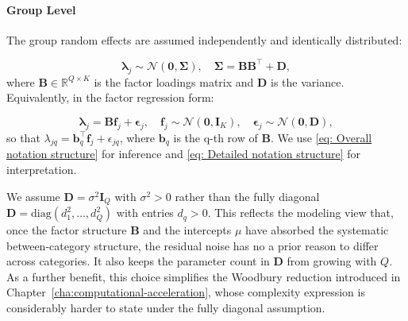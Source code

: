 \paragraph*{Group Level}

The group random effects are assumed independently and identically distributed:

\begin{equation}
    \bm{\lambda}_{j}\sim \mathcal{N}(\bm{0},\bm{\Sigma}), \quad \bm{\Sigma}=\mathbf{BB}^{\top}+\mathbf{D},
    \label{eq: Overall notation structure}
\end{equation}
where $\mathbf{B}\in \mathbb{R}^{Q\times K}$ is the factor loadings matrix and $\mathbf{D}$ is the variance. Equivalently, in the factor regression form:

\begin{equation}
    \bm{\lambda}_{j}=\mathbf{B}\mathbf{f}_{j}+\bm{\epsilon}_{j}, \quad \mathbf{f}_{j}\sim \mathcal{N}(\bm{0},\bm{I}_{K}), \quad \bm{\epsilon}_{j}\sim \mathcal{N}(\bm{0},\mathbf{D}),
    \label{eq: Detailed notation structure}
\end{equation}
so that $\lambda_{jq}=\mathbf{b}_{q}^{\top}\mathbf{f}_{j}+\epsilon_{jq}$, where $\mathbf{b}_{q}$ is the q-th row of $\mathbf{B}$. We use \eqref{eq: Overall notation structure} for inference and \eqref{eq: Detailed notation structure} for interpretation.

We assume $\mathbf{D}=\sigma^{2}\mathbf{I}_{Q}$ with $\sigma^{2} >0$ rather than the fully diagonal $\mathbf{D}=\text{diag}(d_{1}^{2},\dots,d_{Q}^{2})$ with entries $d_{q}>0$. This reflects the modeling view that, once the factor structure $\mathbf{B}$ and the intercepts $\mu$ have absorbed the systematic between-category structure, the residual noise has no a prior reason to differ across categories. It also keeps the parameter count in $\mathbf{D}$ from growing with $Q$. As a further benefit, this choice simplifies the Woodbury reduction introduced in Chapter~\ref{cha:computational-acceleration}, whose complexity expression is considerably harder to state under the fully diagonal assumption.

